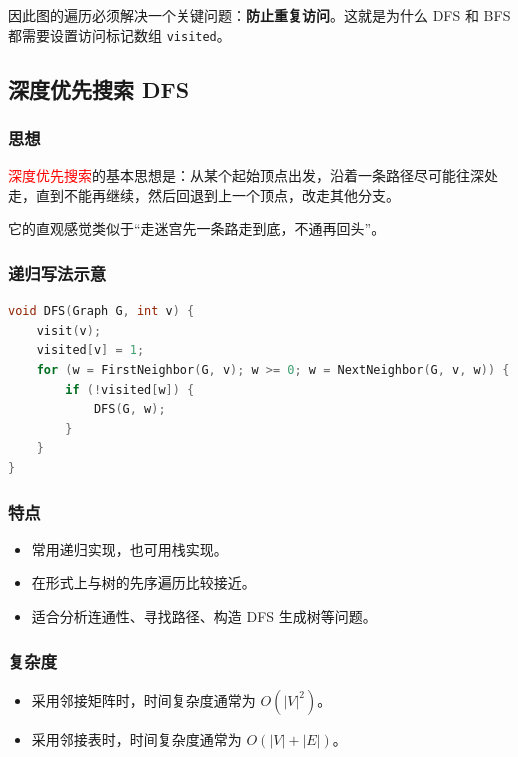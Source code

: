 \documentclass{../../note}
\begin{document}
因此图的遍历必须解决一个关键问题：\textbf{防止重复访问}。这就是为什么 DFS 和 BFS 都需要设置访问标记数组 \texttt{visited}。

\subsection{深度优先搜索 DFS}

\subsubsection{思想}

\textcolor{red}{深度优先搜索}的基本思想是：从某个起始顶点出发，沿着一条路径尽可能往深处走，直到不能再继续，然后回退到上一个顶点，改走其他分支。

它的直观感觉类似于“走迷宫先一条路走到底，不通再回头”。

\subsubsection{递归写法示意}

\begin{lstlisting}[language=C]
void DFS(Graph G, int v) {
    visit(v);
    visited[v] = 1;
    for (w = FirstNeighbor(G, v); w >= 0; w = NextNeighbor(G, v, w)) {
        if (!visited[w]) {
            DFS(G, w);
        }
    }
}
\end{lstlisting}

\subsubsection{特点}

\begin{itemize}
  \item 常用递归实现，也可用栈实现。
  \item 在形式上与树的先序遍历比较接近。
  \item 适合分析连通性、寻找路径、构造 DFS 生成树等问题。
\end{itemize}

\subsubsection{复杂度}

\begin{itemize}
  \item 采用邻接矩阵时，时间复杂度通常为 $O(|V|^2)$。
  \item 采用邻接表时，时间复杂度通常为 $O(|V| + |E|)$。
\end{itemize}
\end{document}
